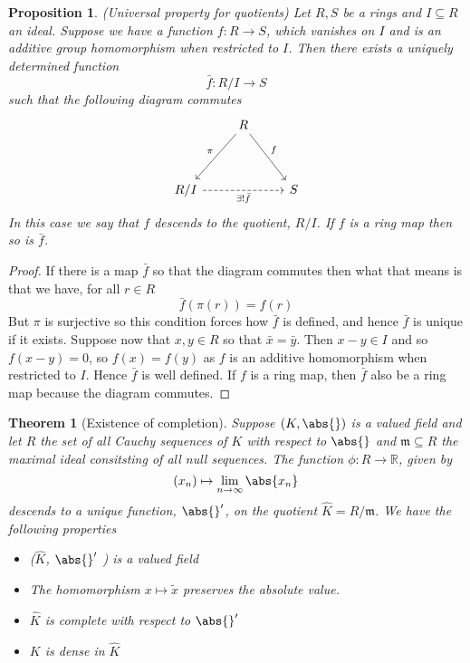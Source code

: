 \documentclass{article}
\newtheorem{theorem}{Theorem}[section]
\newtheorem{proposition}{Proposition}[section]
\newcommand{\mfrak}[1]{\mathfrak{#1}}
\newcommand{\mbb}[1]{\mathbb{#1}}
\begin{document}
\begin{proposition}(Universal property for quotients) \label{prop: Universal property for quotients}
    Let $R,S$ be a rings and $I \subseteq R$ an ideal. Suppose we have a function $f : R \to S$, which vanishes on $I$ and is an additive group homomorphism when restricted to $I$. Then there exists a uniquely determined function $$\bar f : R / I \to S$$
    such that the following diagram commutes
\[\begin{tikzcd}
	& R \\
	\\
	{R/I} && S
	\arrow["{\exists! \bar f}"', dashed, from=3-1, to=3-3]
	\arrow["\pi"', from=1-2, to=3-1]
	\arrow["f", from=1-2, to=3-3]
\end{tikzcd}\]
    In this case we say that $f$ descends to the quotient, $R / I$. If $f$ is a ring map then so is $\bar f$.  
\end{proposition}
\begin{proof}
    If there is a map $\bar f$ so that the diagram commutes then what that means is that we have, for all $r \in R$ 
    $$\bar f (\pi(r)) = f(r)$$
    But $\pi$ is surjective so this condition forces how $\bar f$ is defined, and hence $\bar f$ is unique if it exists. Suppose now that $x,y \in R$ so that $\bar x = \bar y$. Then $x-y \in I$ and so $f(x-y) = 0$, so $f(x) = f(y)$ as $f$ is an additive homomorphism when restricted to $I$. Hence $\bar f$ is well defined. If $f$ is a ring map, then $\bar f$ also be a ring map because the diagram commutes. 
\end{proof}

\begin{theorem}[Existence of completion]
    Suppose $(K, \abs{})$ is a valued field and let $R$ the set of all Cauchy sequences of $K$ with respect to $\abs{}$ and $\mfrak m \subseteq R$ the maximal ideal consitsting of all null sequences. The function $\phi : R \to \mbb R$, given by
    $$(x_n) \mapsto \lim_{n \to \infty} \abs{x_n}$$
    descends to a unique function, $\abs{}'$, on the quotient $\hat K = R / \mfrak m$. We have the following properties
    \begin{itemize}
        \item ($\hat K$, $\abs{}'$ ) is a valued field
        \item The homomorphism $x \mapsto \tilde x$ preserves the absolute value.
        \item $\hat K$ is complete with respect to $\abs{}'$
        \item $K$ is dense in $\hat K$
    \end{itemize}
\end{theorem}
\end{document}
